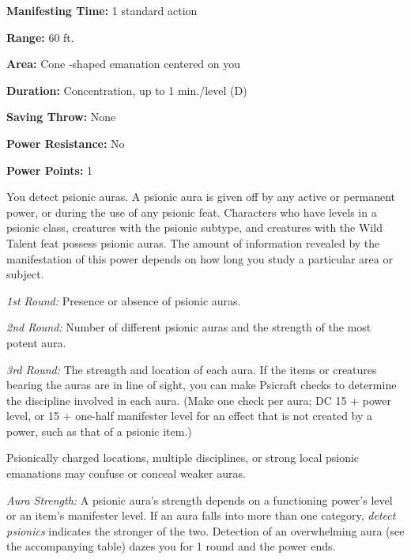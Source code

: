 \documentclass{article}
\begin{document}
\textbf{Manifesting Time:} 1 standard action

\textbf{Range:} 60 ft.

\textbf{Area:} Cone -shaped emanation centered on you

\textbf{Duration:} Concentration, up to 1 min./level (D)

\textbf{Saving Throw:} None

\textbf{Power Resistance:} No

\textbf{Power Points:} 1

You detect psionic auras. A psionic aura is given off by any active or permanent 
power, or during the use of any psionic feat. Characters who have levels in a psionic 
class, creatures with the psionic subtype, and creatures with the Wild Talent feat 
possess psionic auras. The amount of information revealed by the manifestation 
of this power depends on how long you study a particular area or subject.

\textit{1st Round: }Presence or absence of psionic auras.

\textit{2nd Round: }Number of different psionic auras and the strength of the most 
potent aura.

\textit{3rd Round: }The strength and location of each aura. If the items or creatures 
bearing the auras are in line of sight, you can make Psicraft checks to determine 
the discipline involved in each aura. (Make one check per aura; DC 15 + power level, 
or 15 + one-half manifester level for an effect that is not created by a power, 
such as that of a psionic item.)

Psionically charged locations, multiple disciplines, or strong local psionic emanations 
may confuse or conceal weaker auras.

\vspace{12pt}
\textit{Aura Strength: }A psionic aura's strength depends on a functioning power's 
level or an item's manifester level. If an aura falls into more than one category, 
\textit{detect psionics }indicates the stronger of the two. Detection of an overwhelming 
aura (see the accompanying table) dazes you for 1 round and the power ends.
\end{document}
